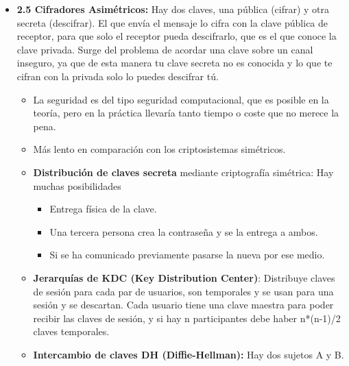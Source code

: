 \documentclass[12pt, twoside, openright]{report} %
\begin{document}
  \begin{itemize}
  \item \textbf{2.5 Cifradores Asimétricos:} Hay dos claves, una pública
    (cifrar) y otra secreta (descifrar). El que envía el mensaje lo
    cifra con la clave pública de receptor, para que solo el receptor
    pueda descifrarlo, que es el que conoce la clave privada. Surge del
    problema de acordar una clave sobre un canal inseguro, ya que de
    esta manera tu clave secreta no es conocida y lo que te cifran con
    la privada solo lo puedes descifrar tú.
    

    \begin{itemize}
    \item La seguridad es del tipo seguridad computacional, que es posible
      en la teoría, pero en la práctica llevaría tanto tiempo o coste
      que no merece la pena.
      
    \item Más lento en comparación con los criptosistemas simétricos.
      
    \end{itemize}

    \begin{itemize}
    \item \textbf{Distribución de claves secreta} mediante criptografía
      simétrica: Hay muchas posibilidades
      

      \begin{itemize}
      \item Entrega física de la clave.
        
      \item Una tercera persona crea la contraseña y se la entrega a ambos.
        
      \item Si se ha comunicado previamente pasarse la nueva por ese medio.
        
      \end{itemize}
    \item \textbf{Jerarquías de KDC (Key Distribution Center)}: Distribuye
      claves de sesión para cada par de usuarios, son temporales y se
      usan para una sesión y se descartan. Cada usuario tiene una clave
      maestra para poder recibir las claves de sesión, y si hay n
      participantes debe haber n*(n-1)/2 claves temporales.
      
    \item \textbf{Intercambio de claves DH (Diffie-Hellman):} Hay dos
      sujetos A y B.
      


\end{itemize}
\end{itemize}
\end{document}
